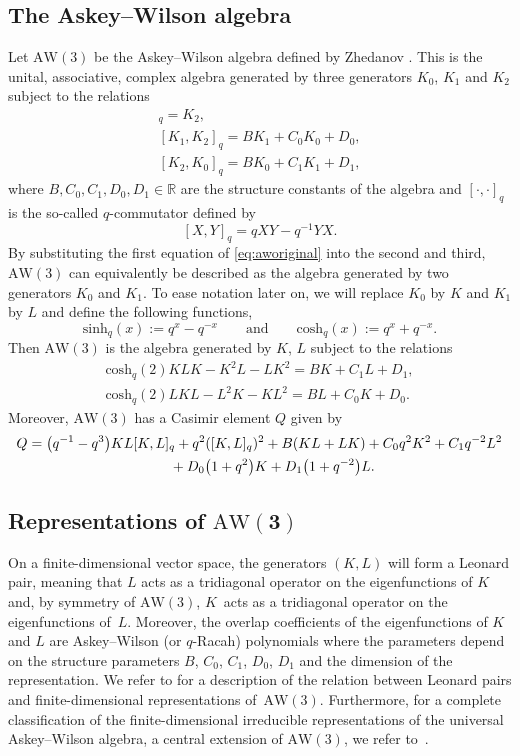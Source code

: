 \documentclass[10pt,a4paper]{amsart}
\numberwithin{equation}{section}
\newcommand{\RR}{\mathbb{R}}
\newcommand{\aw}{\mathrm{AW}\!\left(3\right)}
\newcommand{\chq}{\mathrm{cosh}_q}
\newcommand{\shq}{\mathrm{sinh}_q}
\begin{document}
\subsection{The Askey--Wilson algebra}
Let $\aw$ be the Askey--Wilson algebra defined by Zhedanov \cite{Zhedanov1991}. This is the unital, associative, complex algebra generated by three generators $K_0$, $K_1$ and $K_2$ subject to the relations
\begin{gather}
[K_0,K_1]_q=K_2,\nonumber\\
[K_1,K_2]_q=BK_1 + C_0K_0+D_0,\label{eq:aworiginal}\\
[K_2,K_0]_q=BK_0+C_1K_1 + D_1,\nonumber
	\end{gather}
where $B,C_0,C_1,D_0,D_1\in\RR$ are the structure constants of the algebra and $[\cdot,\cdot]_q$ is the so-called $q$-commutator defined by
\[
[X,Y]_q=q XY - q^{-1}YX.
\]
By substituting the first equation of \eqref{eq:aworiginal} into the second and third, $\aw$ can equivalently be described as the algebra generated by two generators $K_0$ and $K_1$. To ease notation later on, we will replace $K_0$ by $K$ and $K_1$ by $L$ and define the following functions,
\[
\shq(x):=q^x-q^{-x} \qquad \text{and} \qquad \chq(x):=q^x+q^{-x}.
\]
Then $\aw$ is the algebra generated by $K$, $L$ subject to the relations
\begin{gather}
	\chq(2)KLK - K^2L-LK^2= BK + C_1L + D_1,\label{eq:awrelation2}\\
	\chq(2)LKL - L^2K-KL^2= BL + C_0K + D_0 \label{eq:awrelation1}.	 		
\end{gather}
Moreover, $\aw$ has a Casimir element $Q$ given by
\begin{gather}
Q= \big(q^{-1}-q^3\big)KL[K,L]_q + q^2 ([K,L]_q )^2+B(KL+LK)+C_0q^2K^2+C_1q^{-2}L^2\nonumber\\
\hphantom{Q= }{} + D_0\big(1+q^2\big)K+D_1\big(1+q^{-2}\big)L. \label{eq:casimiraw3}
\end{gather}

\subsection[Representations of AW(3)]{Representations of $\boldsymbol{\aw}$} \label{ssec:representationsAW(3)}
On a finite-dimensional vector space, the generators $(K,L)$ will form a Leonard pair, meaning that $L$ acts as a tridiagonal operator on the eigenfunctions of $K$ and, by symmetry of $\aw$, $K$~acts as a tridiagonal operator on the eigenfunctions of~$L$. Moreover, the overlap coefficients of the eigenfunctions of $K$ and $L$ are Askey--Wilson (or $q$-Racah) polynomials where the parameters depend on the structure parameters $B$, $C_0$, $C_1$, $D_0$, $D_1$ and the dimension of the representation. We refer to \cite{TV2004,Vidunas2007} for a description of the relation between Leonard pairs and finite-dimensional representations of~$\aw$. Furthermore, for a complete classification of the finite-dimensional irreducible representations of the universal Askey--Wilson algebra, a central extension of $\aw$, we refer to~\cite{Huang2015}.
\end{document}
